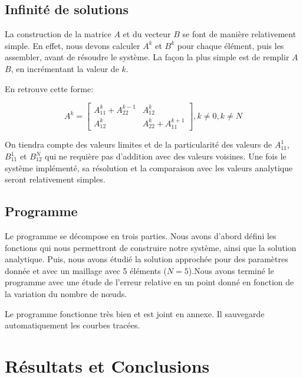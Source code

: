 \documentclass[a4paper,10pt]{report} %
\begin{document}
\section{Infinité de solutions}



















La construction de la matrice $A$ et du vecteur $B$ se font de manière relativement simple. En effet, nous devons calculer $A^k$ et $B^k$ pour chaque élément, puis les assembler, avant de résoudre le système.
La façon la plus simple est de remplir $A$ $B$, en incrémentant la valeur de $k$.

En retrouve cette forme:

$$A^k =\begin{bmatrix}
A^k_11 + A^{k-1}_22 & A^k_12 \\
A^k_12 & A^k_22 + A^{k+1}_11
\end{bmatrix}, k \neq 0, k \neq N$$

On tiendra compte des valeurs limites et de la particularité des valeurs de $A^1_{11}$,$B^1_{11}$ et $B^N_{12}$ qui ne requière pas d'addition avec des valeurs voisines.
Une fois le système implémenté, sa résolution et la comparaison avec les valeurs analytique seront relativement simples.

\section{Programme}

Le programme se décompose en trois parties. Nous avons d'abord défini les fonctions qui nous permettront de construire notre système, ainsi que la solution analytique. Puis, nous avons étudié la solution approchée pour des paramètres donnée et avec un maillage avec 5 éléments ($N=5$).Nous avons terminé le programme avec une étude de l'erreur relative en un point donné en fonction de la variation du nombre de nœuds.

Le programme fonctionne très bien et est joint en annexe. Il sauvegarde automatiquement les courbes tracées.



\chapter{Résultats et Conclusions}
\end{document}
